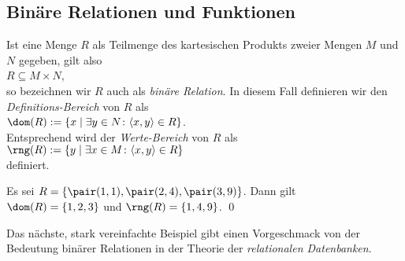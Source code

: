 \subsection{Bin\"{a}re Relationen und Funktionen}
Ist eine Menge $R$ als Teilmenge des kartesischen Produkts zweier Mengen $M$ und $N$ gegeben, gilt
also \\[0.2cm]
\hspace*{1.3cm} $R \subseteq M \times N$, \\[0.2cm]
so bezeichnen wir $R$ auch als \emph{bin\"{a}re Relation}.  In diesem Fall definieren wir den
\emph{Definitions-Bereich} von $R$ als \\[0.2cm]
\hspace*{1.3cm} $\dom(R) := \{ x \mid \exists y \in N \colon \langle x, y \rangle \in R \}$.  
\\[0.2cm]
Entsprechend wird der \emph{Werte-Bereich} von $R$ als \\[0.2cm]
\hspace*{1.3cm} $\rng(R) := \{ y \mid \exists x \in M \colon \langle x, y \rangle \in R\}$ \\[0.2cm]
definiert.  

\example
 Es sei $R = \{ \pair(1,1), \pair(2,4), \pair(3,9) \}$.  Dann gilt \\[0.2cm]
\hspace*{1.3cm} $\dom(R) = \{1,2,3\}$ \quad und \quad $\rng(R) = \{1,4,9\}$. \qed
\next

\noindent
Das n\"{a}chste, stark vereinfachte Beispiel gibt einen Vorgeschmack von der Bedeutung bin\"{a}rer
Relationen in der Theorie der \emph{relationalen Datenbanken}.

